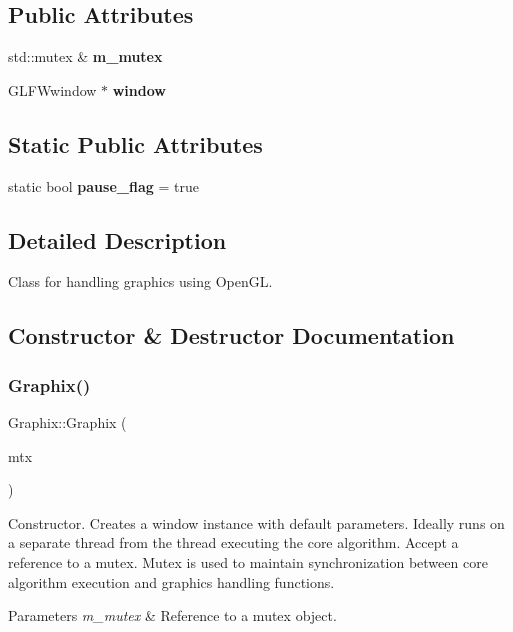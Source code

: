 \subsection*{Public Attributes}
\begin{DoxyCompactItemize}
\item 
\mbox{\label{classGraphix_ab2136667d30ca5f0017bceded579a803}} 
std\+::mutex \& {\bfseries m\+\_\+mutex}
\item 
\mbox{\label{classGraphix_a8189df95428d2fda74b1becb84ed07c2}} 
G\+L\+F\+Wwindow $\ast$ {\bfseries window}
\end{DoxyCompactItemize}
\subsection*{Static Public Attributes}
\begin{DoxyCompactItemize}
\item 
\mbox{\label{classGraphix_ab883fc83301f2a1a9d55b7ed8828bf66}} 
static bool {\bfseries pause\+\_\+flag} = true
\end{DoxyCompactItemize}


\subsection{Detailed Description}
Class for handling graphics using Open\+GL. 

\subsection{Constructor \& Destructor Documentation}
\mbox{\label{classGraphix_a1d4cb173e0d22fee13a657489b7b55de}} 
\subsubsection{\texorpdfstring{Graphix()}{Graphix()}}
{\footnotesize\ttfamily Graphix\+::\+Graphix (\begin{DoxyParamCaption}\item[{std\+::mutex \&}]{mtx }\end{DoxyParamCaption})}

Constructor. Creates a window instance with default parameters. Ideally runs on a separate thread from the thread executing the core algorithm. Accept a reference to a mutex. Mutex is used to maintain synchronization between core algorithm execution and graphics handling functions. 
\begin{DoxyParams}{Parameters}
{\em m\+\_\+mutex} & Reference to a mutex object. \\
\hline
\end{DoxyParams}


